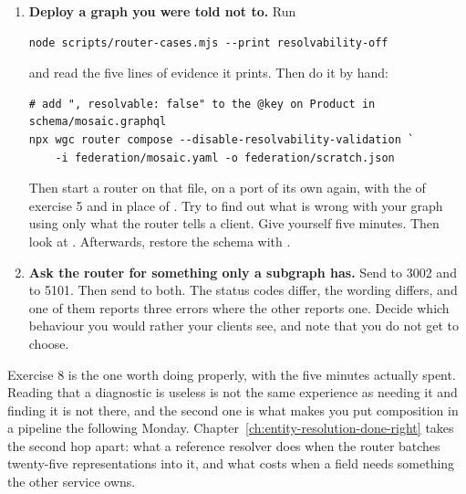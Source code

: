 \begin{enumerate}
  \item \textbf{Deploy a graph you were told not to.} Run

  \begin{verbatim}
node scripts/router-cases.mjs --print resolvability-off
  \end{verbatim}

  and read the five lines of evidence it prints. Then do it by hand:

  \begin{verbatim}
# add ", resolvable: false" to the @key on Product in schema/mosaic.graphql
npx wgc router compose --disable-resolvability-validation `
    -i federation/mosaic.yaml -o federation/scratch.json
  \end{verbatim}

  Then start a router on that file, on a port of its own again, with the
   of exercise 5 and  in place of
  . Try to find out what is wrong with your graph using
  only what the router tells a client. Give yourself five minutes. Then look at
  . Afterwards, restore the schema with
  .

  \item \textbf{Ask the router for something only a subgraph has.} Send
   to 3002 and to 5101. Then send
   to both. The status codes differ, the wording
  differs, and one of them reports three errors where the other reports one.
  Decide which behaviour you would rather your clients see, and note that you
  do not get to choose.
\end{enumerate}

Exercise 8 is the one worth doing properly, with the five minutes actually
spent. Reading that a diagnostic is useless is not the same experience as
needing it and finding it is not there, and the second one is what makes you
put composition in a pipeline the following Monday.
Chapter~\ref{ch:entity-resolution-done-right} takes the second hop apart: what
a reference resolver does when the router batches twenty-five representations
into it, and what  costs when a field needs something the other
service owns.
